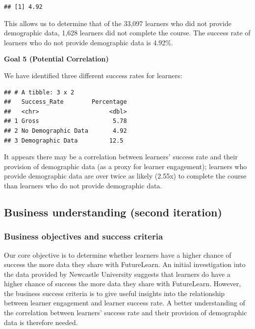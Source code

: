 \documentclass[
]{article}
\begin{document}
\begin{verbatim}
## [1] 4.92
\end{verbatim}

This allows us to determine that of the 33,097 learners who did not
provide demographic data, 1,628 learners did not complete the course.
The success rate of learners who do not provide demographic data is
4.92\%.

\textbf{Goal 5 (Potential Correlation)}

We have identified three different success rates for learners:

\begin{verbatim}
## # A tibble: 3 x 2
##   Success_Rate        Percentage
##   <chr>                    <dbl>
## 1 Gross                     5.78
## 2 No Demographic Data       4.92
## 3 Demographic Data         12.5
\end{verbatim}

It appears there may be a correlation between learners' success rate and
their provision of demographic data (as a proxy for learner engagement);
learners who provide demographic data are over twice as likely (2.55x)
to complete the course than learners who do not provide demographic
data.

\hypertarget{business-understanding-second-iteration}{%
\subsection{Business understanding (second
iteration)}\label{business-understanding-second-iteration}}

\hypertarget{business-objectives-and-success-criteria-1}{%
\subsubsection{Business objectives and success
criteria}\label{business-objectives-and-success-criteria-1}}

Our core objective is to determine whether learners have a higher chance
of success the more data they share with FutureLearn. An initial
investigation into the data provided by Newcastle University suggests
that learners do have a higher chance of success the more data they
share with FutureLearn. However, the business success criteria is to
give useful insights into the relationship between learner engagement
and learner success rate. A better understanding of the correlation
between learners' success rate and their provision of demographic data
is therefore needed.
\end{document}

